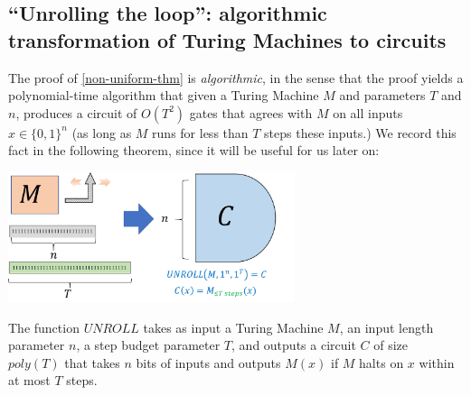 \subsection{``Unrolling the loop'': algorithmic transformation of Turing
Machines to circuits}\label{unrollloopsec}

The proof of \cref{non-uniform-thm} is \emph{algorithmic}, in the sense
that the proof yields a polynomial-time algorithm that given a Turing
Machine \(M\) and parameters \(T\) and \(n\), produces a circuit of
\(O(T^2)\) gates that agrees with \(M\) on all inputs \(x\in \{0,1\}^n\)
(as long as \(M\) runs for less than \(T\) steps these inputs.) We
record this fact in the following theorem, since it will be useful for
us later on:


\begin{marginfigure}
\centering
\includegraphics[width=\linewidth, height=1.5in, keepaspectratio]{../figure/unrollloop_alg.png}
\caption{The function \(\ensuremath{\mathit{UNROLL}}\) takes as input a
Turing Machine \(M\), an input length parameter \(n\), a step budget
parameter \(T\), and outputs a circuit \(C\) of size \(poly(T)\) that
takes \(n\) bits of inputs and outputs \(M(x)\) if \(M\) halts on \(x\)
within at most \(T\) steps.}
\label{unrollloopfig}
\end{marginfigure}

\hypertarget{nand-compiler}{}

